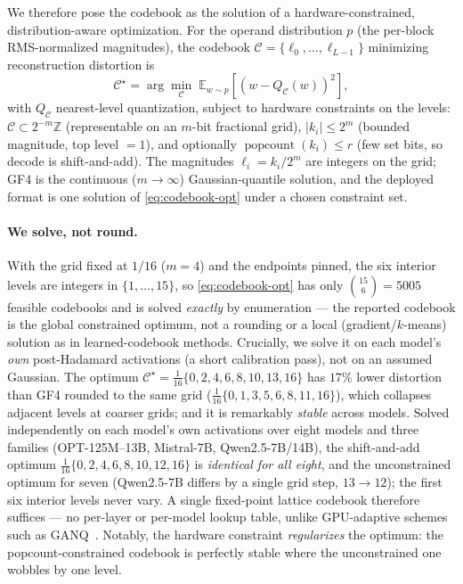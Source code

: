 We therefore pose the codebook as the solution of a hardware-constrained,
distribution-aware optimization. For the operand distribution $p$ (the per-block
RMS-normalized magnitudes), the codebook $\mathcal{C}=\{\ell_0,\dots,\ell_{L-1}\}$
minimizing reconstruction distortion is
\begin{equation}
  \mathcal{C}^\star = \arg\min_{\mathcal{C}}\;
  \mathbb{E}_{w\sim p}\!\left[(w - Q_{\mathcal{C}}(w))^2\right],
  \label{eq:codebook-opt}
\end{equation}
with $Q_{\mathcal{C}}$ nearest-level quantization, subject to hardware
constraints on the levels: $\mathcal{C}\subset 2^{-m}\mathbb{Z}$ (representable on
an $m$-bit fractional grid), $|k_i|\le 2^{m}$ (bounded magnitude, top level
$=1$), and optionally $\operatorname{popcount}(k_i)\le r$ (few set bits, so decode
is shift-and-add). The magnitudes $\ell_i=k_i/2^m$ are integers on the grid; GF4
is the continuous ($m\!\to\!\infty$) Gaussian-quantile solution, and the deployed
format is one solution of \eqref{eq:codebook-opt} under a chosen constraint set.

\paragraph{We solve, not round.} With the grid fixed at $1/16$ ($m=4$) and the
endpoints pinned, the six interior levels are integers in $\{1,\dots,15\}$, so
\eqref{eq:codebook-opt} has only $\binom{15}{6}=5005$ feasible codebooks and is
solved \emph{exactly} by enumeration --- the reported codebook is the global
constrained optimum, not a rounding or a local (gradient/$k$-means) solution as
in learned-codebook methods. Crucially, we solve it on each model's \emph{own}
post-Hadamard activations (a short calibration pass), not on an assumed Gaussian.
The optimum $\mathcal{C}^\star=\tfrac{1}{16}\{0,2,4,6,8,10,13,16\}$ has $17\%$
lower distortion than GF4 rounded to the same grid
($\tfrac{1}{16}\{0,1,3,5,6,8,11,16\}$), which collapses adjacent levels at coarser
grids; and it is remarkably \emph{stable} across models. Solved independently on
each model's own activations over eight models and three families (OPT-125M–13B,
Mistral-7B, Qwen2.5-7B/14B), the shift-and-add optimum
$\tfrac{1}{16}\{0,2,4,6,8,10,12,16\}$ is \emph{identical for all eight}, and the
unconstrained optimum for seven (Qwen2.5-7B differs by a single grid step,
$13\!\to\!12$); the first six interior levels never vary. A single fixed-point
lattice codebook therefore suffices --- no per-layer or per-model lookup table,
unlike GPU-adaptive schemes such as GANQ~\cite{zhao2025ganq}. Notably, the
hardware constraint \emph{regularizes} the optimum: the popcount-constrained
codebook is perfectly stable where the unconstrained one wobbles by one level.

